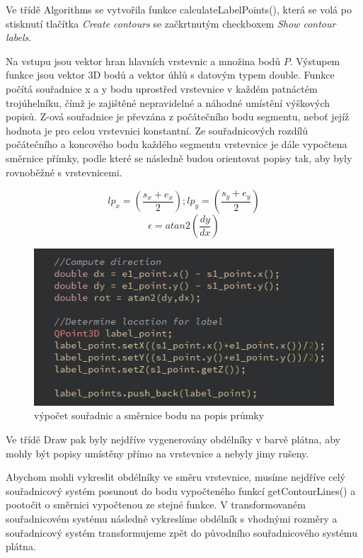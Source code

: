 \documentclass[11pt]{article}
\begin{document}
Ve třídě Algorithms se vytvořila funkce calculateLabelPoints(), která se volá po stisknutí tlačítka \textit{Create contours} se začkrtnutým checkboxem \textit{Show contour labels}.

Na vstupu jsou vektor hran hlavních vrstevnic a množina bodů $P$. Výstupem funkce jsou vektor 3D bodů a vektor úhlů s datovým typem double. Funkce počítá souřadnice x a y bodu  uprostřed vrstevnice v každém patnáctém trojúhelníku, čímž je zajištěné nepravidelné a náhodné umístění výškových popisů. Z-ová souřadnice je převzána z počátečního bodu segmentu, neboť jejíž hodnota je pro celou vrstevnici konstantní. Ze souřadnicových rozdílů počátečního a koncového bodu každého segmentu vrstevnice je dále vypočtena směrnice přímky, podle které se následně budou orientovat popisy tak, aby byly rovnoběžné s vrstevnicemi.

$$ lp_x = ( \frac{s_x + e_x}{2});  lp_y = ( \frac{s_y + e_y}{2}) $$ 
$$ \epsilon = atan2( \frac{dy}{dx}) $$

\begin{figure}[htbh]
	\centering
	\includegraphics[scale=1]{images/getContourLabels.png} 
	\caption{výpočet souřadnic a směrnice bodu na popis průmky}
	\label{fig:getContourLines()}
\end{figure} 

Ve třídě Draw pak byly nejdříve vygenerovány obdélníky v barvě plátna, aby mohly být popisy umístěny přímo na vrstevnice a nebyly jimy rušeny. 

Abychom mohli vykreslit obdélníky ve směru vrstevnice, musíme nejdříve celý souřadnicový systém posunout do bodu vypočteného funkcí getContourLines() a pootočit o směrnici vypočtenou ze stejné funkce. V transformovaném souřadnicovém systému následně vykreslíme obdélník s vhodnými rozměry a souřadnicový systém transformujeme zpět do původního souřadnicového systému plátna.
\end{document}
